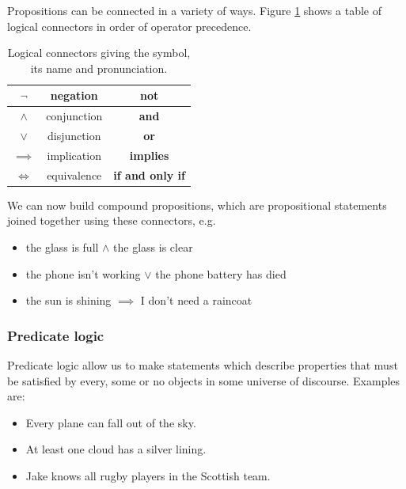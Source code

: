 Propositions can be connected in a variety of ways. Figure \ref{tab:logcon}
shows a table of logical connectors in order of operator precedence.

\begin{table}[H]
\centering
\begin{tabular}{| c | c | c |}
\hline
$\neg$ & negation & \textbf{not} \\
\hline
$\land$ & conjunction & \textbf{and} \\
\hline
$\lor$ & disjunction & \textbf{or} \\
\hline
$\implies$ & implication & \textbf{implies} \\
\hline
$\Leftrightarrow$ & equivalence & \textbf{if and only if} \\
\hline
\end{tabular}
\caption{Logical connectors giving the symbol, its name and pronunciation. \label{tab:logcon}}
\end{table}

We can now build compound propositions, which are propositional statements
joined together using these connectors, e.g.

\begin{itemize}
\item the glass is full $\land$ the glass is clear

\item the phone isn't working $\lor$ the phone battery has died

\item the sun is shining $\implies$ I don't need a raincoat
\end{itemize}

\subsubsection{Predicate logic}

Predicate logic allow us to make statements which describe properties that must
be satisfied by every, some or no objects in some universe of discourse.
Examples are:

\begin{itemize}
\item Every plane can fall out of the sky.

\item At least one cloud has a silver lining.

\item Jake knows all rugby players in the Scottish team.
\end{itemize}


